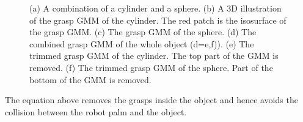 \begin{figure}
\begin{minipage}[c]{1\textwidth}
    \end{minipage}

\caption{\scriptsize{(a) A combination of a cylinder and a sphere. (b) A 3D illustration of the grasp GMM of the cylinder. The red patch is the isosurface of the grasp GMM. (c) The grasp GMM of the sphere. (d) The combined grasp GMM of the whole object (d={e,f})). (e) The trimmed grasp GMM of the cylinder. The top part of the GMM is removed. (f) The trimmed grasp GMM of the sphere. Part of the bottom of the GMM is removed.}}
\label{fig:object}
\end{figure}


The equation above removes the grasps inside the object and hence avoids the collision between the robot palm and the object. 



